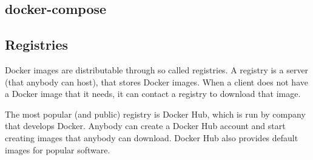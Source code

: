 \subsection{docker-compose}

\subsection{Registries}

Docker images are distributable through so called registries. A registry is a server (that anybody can host), that stores Docker images. When a client does not have a Docker image that it needs, it can contact a registry to download that image.

\hfill

The most popular (and public) registry is Docker Hub, which is run by company that develops Docker.
Anybody can create a Docker Hub account and start creating images that anybody can download. Docker Hub also provides default images for popular software.
